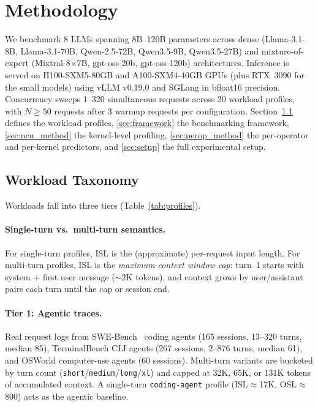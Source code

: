 \section{Methodology}
\label{sec:method}

We benchmark 8 LLMs spanning 8B--120B parameters across dense (Llama-3.1-8B, Llama-3.1-70B, Qwen-2.5-72B, Qwen3.5-9B, Qwen3.5-27B) and mixture-of-expert (Mixtral-8$\times$7B, gpt-oss-20b, gpt-oss-120b) architectures. Inference is served on H100-SXM5-80GB and A100-SXM4-40GB GPUs (plus RTX~3090 for the small models) using vLLM v0.19.0 and SGLang in bfloat16 precision. Concurrency sweeps 1--320 simultaneous requests across 20 workload profiles, with $N{\geq}50$ requests after 3 warmup requests per configuration. Section~\ref{sec:taxonomy} defines the workload profiles, \ref{sec:framework} the benchmarking framework, \ref{sec:ncu_method} the kernel-level profiling, \ref{sec:perop_method} the per-operator and per-kernel predictors, and \ref{sec:setup} the full experimental setup.

\subsection{Workload Taxonomy}
\label{sec:taxonomy}

Workloads fall into three tiers (Table~\ref{tab:profiles}).

\paragraph{Single-turn vs.\ multi-turn semantics.} For single-turn profiles, ISL is the (approximate) per-request input length. For multi-turn profiles, ISL is the \emph{maximum context window cap}: turn~1 starts with system + first user message ($\sim$2K tokens), and context grows by user/assistant pairs each turn until the cap or session end.

\paragraph{Tier 1: Agentic traces.} Real request logs from SWE-Bench~\citep{swebench} coding agents (165 sessions, 13--320 turns, median 85), TerminalBench CLI agents (267 sessions, 2--876 turns, median 61), and OSWorld computer-use agents (60 sessions). Multi-turn variants are bucketed by turn count (\texttt{short}/\texttt{medium}/\texttt{long}/\texttt{xl}) and capped at 32K, 65K, or 131K tokens of accumulated context. A single-turn \texttt{coding-agent} profile (ISL$\approx$17K, OSL$\approx$800) acts as the agentic baseline.

